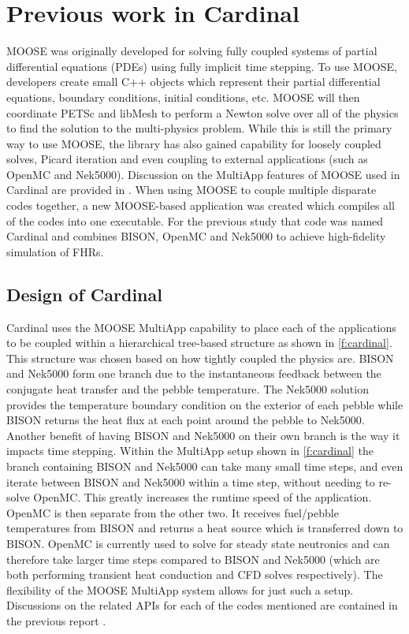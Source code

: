 \section{Previous work in Cardinal}
\label{s:cardinal}

MOOSE was originally developed for solving fully coupled systems of partial differential equations (PDEs) using fully implicit time stepping.
To use MOOSE, developers create small C++ objects which represent their partial differential equations, boundary conditions, initial conditions, etc.
MOOSE will then coordinate PETSc and libMesh to perform a Newton solve over all of the physics to find the solution to the multi-physics problem.
While this is still the primary way to use MOOSE, the library has also gained capability for loosely coupled solves, Picard iteration and even coupling to external applications (such as OpenMC and Nek5000).
Discussion on the MultiApp features of MOOSE used in Cardinal are provided in \cite{cardinal}.
When using MOOSE to couple multiple disparate codes together, a new MOOSE-based application was created \cite{cardinal} which compiles all of the codes into one executable.
For the previous study that code was named Cardinal and combines BISON, OpenMC and Nek5000 to achieve high-fidelity simulation of FHRs.

\subsection{Design of Cardinal}
\label{ss:c1}

Cardinal uses the MOOSE MultiApp capability to place each of the applications to be coupled within a hierarchical tree-based structure as shown in \autoref{f:cardinal}.
This structure was chosen based on how tightly coupled the physics are.
BISON and Nek5000 form one branch due to the instantaneous feedback between the conjugate heat transfer and the pebble temperature.
The Nek5000 solution provides the temperature boundary condition on the exterior of each pebble while BISON returns the heat flux at each point around the pebble to Nek5000.
Another benefit of having BISON and Nek5000 on their own branch is the way it impacts time stepping.
Within the MultiApp setup shown in \autoref{f:cardinal} the branch containing BISON and Nek5000 can take many small time steps, and even iterate between BISON and Nek5000 within a time step, without needing to re-solve OpenMC.
This greatly increases the runtime speed of the application.
OpenMC is then separate from the other two.
It receives fuel/pebble temperatures from BISON and returns a heat source which is transferred down to BISON.
OpenMC is currently used to solve for steady state neutronics and can therefore take larger time steps compared to BISON and Nek5000 (which are both performing transient heat conduction and CFD solves respectively).
The flexibility of the MOOSE MultiApp system allows for just such a setup.
Discussions on the related APIs for each of the codes mentioned are contained in the previous report \cite{cardinal}.

